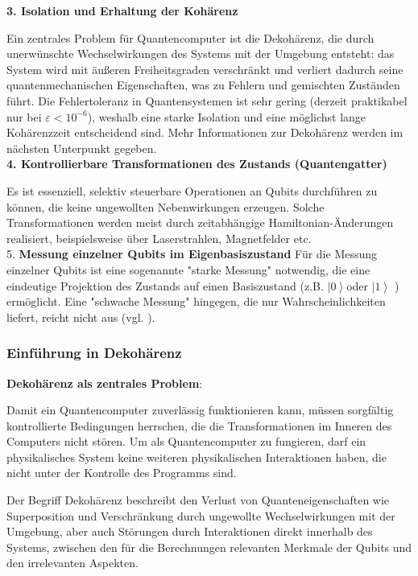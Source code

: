 \textbf{3. Isolation und Erhaltung der Kohärenz} 

Ein zentrales Problem für Quantencomputer ist die Dekohärenz, die durch unerwünschte Wechselwirkungen des Systems mit der Umgebung entsteht: das System wird mit äußeren Freiheitsgraden verschränkt und verliert dadurch seine quantenmechanischen Eigenschaften, was zu Fehlern und gemischten Zuständen führt. Die Fehlertoleranz in Quantensystemen ist sehr gering (derzeit praktikabel nur bei $\varepsilon < 10^{-6}$), weshalb eine starke Isolation und eine möglichst lange Kohärenzzeit entscheidend sind. Mehr Informationen zur Dekohärenz werden im nächsten Unterpunkt gegeben. \\

 
\textbf{4. Kontrollierbare Transformationen des Zustands (Quantengatter)}

Es ist essenziell, selektiv steuerbare Operationen an Qubits durchführen zu können, die keine ungewollten Nebenwirkungen erzeugen. Solche Transformationen werden meist durch zeitabhängige Hamiltonian-Änderungen realisiert, beispielsweise über Laserstrahlen, Magnetfelder etc. \\


5. \textbf{Messung einzelner Qubits im Eigenbasiszustand} 
Für die Messung einzelner Qubits ist eine sogenannte "starke Messung" notwendig, die eine eindeutige Projektion des Zustands auf einen Basiszustand (z.B.  \(\left| 0\right\rangle\)oder \(\left| 1 \right\rangle\) ) ermöglicht. Eine "schwache Messung" hingegen, die nur Wahrscheinlichkeiten liefert, reicht nicht aus (vgl. \cite{divincenzo_topics_nodate}).
 
\subsubsection{Einführung in Dekohärenz }

\textbf{Dekohärenz als zentrales Problem}: 

Damit ein Quantencomputer zuverlässig funktionieren kann, müssen sorgfältig kontrollierte Bedingungen herrschen, die die Transformationen im Inneren des Computers nicht stören. Um als Quantencomputer zu fungieren, darf ein physikalisches System keine weiteren physikalischen Interaktionen haben, die nicht unter der Kontrolle des Programms sind. 


Der Begriff Dekohärenz beschreibt den Verlust von Quanteneigenschaften wie Superposition und Verschränkung durch ungewollte Wechselwirkungen mit der Umgebung, aber auch Störungen durch Interaktionen direkt innerhalb des Systems, zwischen den für die Berechnungen relevanten Merkmale der Qubits und den irrelevanten Aspekten. 


